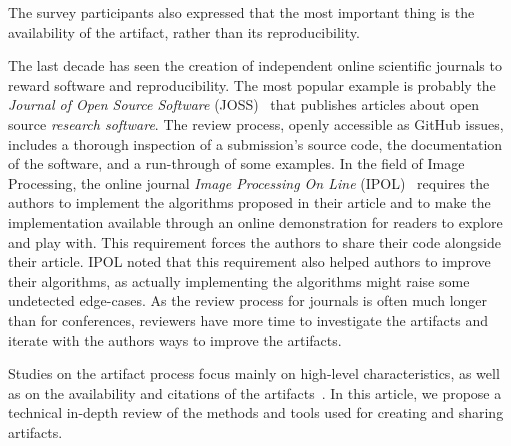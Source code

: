 \documentclass[sigconf,natbib=false]{acmart}
\newcommand{\ad}{Artifact Description}
\newcommand{\aeval}{Artifact Evaluation}
\newcommand{\adae}{\ad/\aeval}
\newcommand{\todo}[1]{{\color{red}{TODO: #1}}}
\begin{document}
The survey participants also expressed that the most important thing is the availability of the artifact, rather than its reproducibility.



The last decade has seen the creation of independent online scientific journals to reward software and reproducibility.
The most popular example is probably the \emph{Journal of Open Source Software} (JOSS)\ \cite{smith2018journal} that publishes articles about open source \emph{research software}.
The review process, openly accessible as GitHub issues, includes a thorough inspection of a submission's source code, the documentation of the software, and a run-through of some examples.
In the field of Image Processing, the online journal \emph{Image Processing On Line} (IPOL)\ \cite{colom2015ipol} requires the authors to implement the algorithms proposed in their article and to make the implementation available through an online demonstration for readers to explore and play with.
This requirement forces the authors to share their code alongside their article.
IPOL noted that this requirement also helped authors to improve their algorithms, as actually implementing the algorithms might raise some undetected edge-cases.
As the review process for journals is often much longer than for conferences, reviewers have more time to investigate the artifacts and iterate with the authors ways to improve the artifacts.



Studies on the artifact process focus mainly on high-level characteristics, as well as on the availability and citations of the artifacts\ \cite{kidwell2016badges, rowhani2017incentives, winter2022retrospective, frachtenberg2022research, heumuller2020publish}. 
In this article, we propose a technical in-depth review of the methods and tools used for creating and sharing artifacts.


%
%
\end{document}
